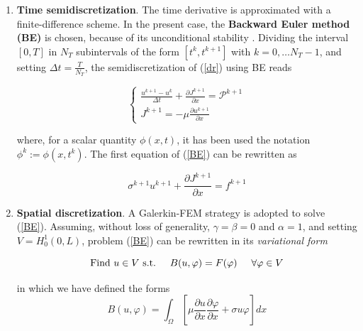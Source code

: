 \documentclass[12pt, a4paper]{report}
\begin{document}
\begin{enumerate}
	\item \textbf{Time semidiscretization}. The time derivative is approximated with a finite-difference scheme. In the present case, the \textbf{Backward Euler method (BE)} is chosen, because of its unconditional stability \cite{39}.%
	 Dividing the interval $[0,T]$ in $N_T$ subintervals of the form $[t^k, t^{k+1}]$ with $ k=0, \dots N_T-1$, and setting $\Delta t = \frac{T}{N_T} $, the semidiscretization of (\ref{dr}) using BE reads
	
	\begin{equation}
	\begin{cases}
	\frac{u^{k+1} - u^k}{\Delta t} +\frac{\partial J^{k+1}}{\partial x} = \mathcal{P}^{k+1}  \\
	J^{k+1} =  - \mu \frac{\partial u^{k+1}}{\partial x} 
	\end{cases} \label{BE}
	\end{equation}
	
	where, for a scalar quantity $\phi(x,t)$, it has been used the notation $ \phi^k := \phi(x,t^k) $. The first equation of (\ref{BE}) can be rewritten as
	
	\begin{equation}
	\sigma ^{k+1} u^{k+1} +\frac{\partial J^{k+1}}{\partial x} = f^{k+1} 
	\end{equation}
	
	\item \textbf{Spatial discretization}. A Galerkin-FEM strategy is adopted to solve (\ref{BE}).  Assuming, without loss of generality, $\gamma = \beta = 0$ and $\alpha =1$, and setting $V = H_0^1(0,L)$,  problem (\ref{BE}) can be rewritten in its \textit{variational form} \cite{40} %
	
	\begin{equation}
	\text{Find $u \in V$ s.t.} \hspace{0.5cm} B(u,\varphi) = F(\varphi) \hspace{0.5cm} \forall \varphi \in V
	\label{variational}
	\end{equation}
	
	in which we have defined the forms
	\begin{equation}
	B(u,\varphi) = \int_{\Omega}\left[\mu \frac{\partial u}{\partial x}  \frac{\partial \varphi}{\partial x} + \sigma u \varphi \right]  dx
	\end{equation}
	

\end{enumerate}
\end{document}
